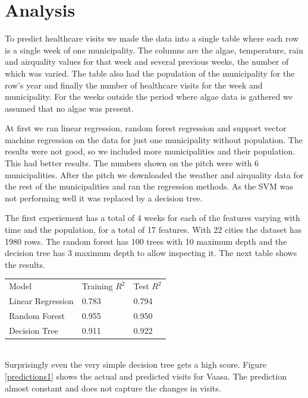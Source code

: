 \documentclass[a4paper, 12pt, english]{article}
\begin{document}
\section{Analysis}
To predict healthcare visits we made the data into a
single table where each row is a single week of one
municipality. The columns are the algae, temperature,
rain and airquality values for that week and several
previous weeks, the number of which was varied.
The table also had the population of the municipality
for the row's year and finally the number of healthcare
visits for the week and municipality.
For the weeks outside the period where algae data
is gathered we assumed that no algae was present.

At first we ran linear regression, random forest regression
and support vector machine regression on the data for just
one municipality without population. The results were not good,
so we included more municipalities and their population.
This had better results. The numbers shown on the
pitch were with 6 municipalities. After the pitch we
downloaded the weather and airquality data for
the rest of the municipalities and ran the regression
methods. As the SVM was not performing well it was
replaced by a decision tree.

The first experiement has a total of 4 weeks for
each of the features varying with time and the
population, for a total of
17 features. With 22 cities the dataset has 1980 rows.
The random forest has 100 trees with 10 maximum depth
and the decision tree has 3 maximum depth to allow
inspecting it. The next table shows the results.\\

\begin{tabular}{l l l}
Model & Training \(R^2\) & Test \(R^2\) \\
Linear Regression & 0.783 & 0.794 \\
Random Forest & 0.955 & 0.950 \\
Decision Tree & 0.911 & 0.922 \\
\end{tabular}
\\

Surprisingly even the very simple decision tree
gets a high score. Figure \ref{predictions1} shows
the actual and predicted visits for Vaasa.
The prediction almost constant and does not capture
the changes in visits.
\end{document}
